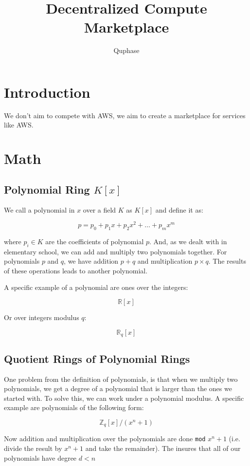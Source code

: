 \documentclass{article}
\title{Decentralized Compute Marketplace}
\author{Quphase}
\date{}
\begin{document}
\maketitle

\section{Introduction}
We don't aim to compete with AWS, we aim to create a marketplace for services like AWS.


\section{Math}
\subsection{Polynomial Ring $K[x]$}

We call a polynomial in $x$ over a field $K$ as $K[x]$ and define it as:

$$p = p_0 + p_1 x + p_2 x^2 + \hdots + p_m x^m$$

where $p_i \in K $ are the coefficients of polynomial $p$. And, as we dealt with in elementary school, we can add and multiply two polynomials together. For polynomials $p$ and $q$, we have addition $p+q$ and multiplication $p \times q$. The results of these operations leads to another polynomial.

A specific example of a polynomial are ones over the integers: 

$$\mathbb{R}[x]$$

Or over integers modulus $q$:

$$\mathbb{R}_q[x]$$



\subsection{Quotient Rings of Polynomial Rings}
One problem from the definition of polynomials, is that when we multiply two polynomials, we get a degree of a polynomial that is larger than the ones we started with. To solve this, we can work under a polynomial modulus. A specific example are polynomials of the following form:

$$\mathbb{Z}_q[x] / (x^n + 1)$$

Now addition and multiplication over the polynomials are done \texttt{mod} $x^n + 1$ (i.e. divide the result by $x^n + 1$ and take the remainder). The insures that all of our polynomials have degree $d < n$
\end{document}
